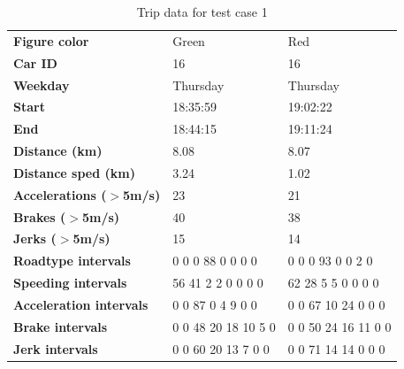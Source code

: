\begin{table}
    \centering
    \begin{tabular}{>{\bfseries}l|ll|}
    Figure color             & Green               & Red                 \\
    Car ID                   & 16                  & 16                  \\
    Weekday                  & Thursday            & Thursday            \\
    Start                    & 18:35:59            & 19:02:22            \\
    End                      & 18:44:15            & 19:11:24            \\
    Distance (km)            & 8.08                & 8.07                \\
    Distance sped (km)       & 3.24                & 1.02                \\
    Accelerations ($>$5m/s)  & 23                  & 21                  \\
    Brakes ($>$5m/s)         & 40                  & 38                  \\
    Jerks ($>$5m/s)          & 15                  & 14                  \\
    Roadtype intervals       & 0 0 0 88 0 0 0 0    & 0 0 0 93 0 0 2 0    \\
    Speeding intervals       & 56 41 2 2 0 0 0 0   & 62 28 5 5 0 0 0 0   \\
    Acceleration intervals   & 0 0 87 0 4 9 0 0    & 0 0 67 10 24 0 0 0  \\
    Brake intervals          & 0 0 48 20 18 10 5 0 & 0 0 50 24 16 11 0 0 \\
    Jerk intervals           & 0 0 60 20 13 7 0 0  & 0 0 71 14 14 0 0 0  \\
    \end{tabular}
    \caption{Trip data for test case 1}
    \label{tab:shorttrips}
\end{table}

